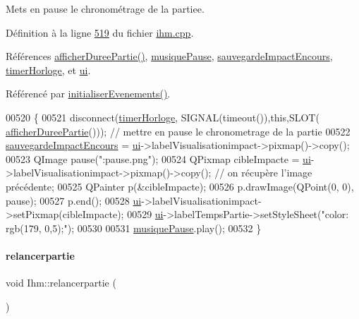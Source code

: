 Mets en pause le chronométrage de la partiee. 



Définition à la ligne \hyperlink{ihm_8cpp_source_l00519}{519} du fichier \hyperlink{ihm_8cpp_source}{ihm.\+cpp}.



Références \hyperlink{ihm_8cpp_source_l00484}{afficher\+Duree\+Partie()}, \hyperlink{ihm_8h_source_l00057}{musique\+Pause}, \hyperlink{ihm_8h_source_l00060}{sauvegarde\+Impact\+Encours}, \hyperlink{ihm_8h_source_l00053}{timer\+Horloge}, et \hyperlink{ihm_8h_source_l00052}{ui}.



Référencé par \hyperlink{ihm_8cpp_source_l00075}{initialiser\+Evenements()}.


\begin{DoxyCode}
00520 \{
00521     disconnect(\hyperlink{class_ihm_a21ea35b212966fa2805241ea6237d351}{timerHorloge}, SIGNAL(timeout()),\textcolor{keyword}{this},SLOT(
      \hyperlink{class_ihm_a808bd550b877499a38419a492595822e}{afficherDureePartie}())); \textcolor{comment}{// mettre en pause le chronometrage de la partie}
00522     \hyperlink{class_ihm_a659c67bf5d1ba3104fb10f23d8b91b37}{sauvegardeImpactEncours} = \hyperlink{class_ihm_a0ac5f47856566ceeeca1720109bf70ea}{ui}->labelVisualisationimpact->pixmap()->copy();
00523     QImage pause(\textcolor{stringliteral}{":pause.png"});
00524     QPixmap cibleImpacte = \hyperlink{class_ihm_a0ac5f47856566ceeeca1720109bf70ea}{ui}->labelVisualisationimpact->pixmap()->copy(); \textcolor{comment}{// on récupère l'image
       précédente;}
00525     QPainter p(&cibleImpacte);
00526     p.drawImage(QPoint(0, 0), pause);
00527     p.end();
00528     \hyperlink{class_ihm_a0ac5f47856566ceeeca1720109bf70ea}{ui}->labelVisualisationimpact->setPixmap(cibleImpacte);
00529     \hyperlink{class_ihm_a0ac5f47856566ceeeca1720109bf70ea}{ui}->labelTempsPartie->setStyleSheet(\textcolor{stringliteral}{"color: rgb(179, 0,5);"});
00530 
00531     \hyperlink{class_ihm_a11e7ae529b6adb7ac98f1aa512172ff2}{musiquePause}.play();
00532 \}
\end{DoxyCode}
\mbox{\label{class_ihm_a3480957ba23548b30dddc717f6cfa577}} 
\paragraph{\texorpdfstring{relancerpartie}{relancerpartie}}
{\footnotesize\ttfamily void Ihm\+::relancerpartie (\begin{DoxyParamCaption}{ }\end{DoxyParamCaption})\hspace{0.3cm}{\ttfamily [slot]}}



